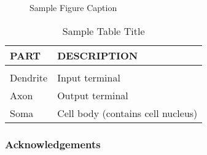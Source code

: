 \documentclass[twoside]{article}
\theoremstyle{definition}
\begin{document}
\begin{figure}[h]
\vspace{.3in}
\centerline{}
\vspace{.3in}
\caption{Sample Figure Caption}
\end{figure}


\begin{table}[h]
\caption{Sample Table Title} \label{sample-table}
\begin{center}
\begin{tabular}{ll}
{\bf PART}  &{\bf DESCRIPTION} \\
\hline \\
Dendrite         &Input terminal \\
Axon             &Output terminal \\
Soma             &Cell body (contains cell nucleus) \\
\end{tabular}
\end{center}
\end{table}
\fi

\subsubsection*{Acknowledgements}




\end{document}

